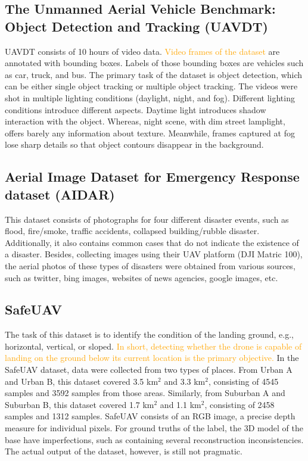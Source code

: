 \subsection{The Unmanned Aerial Vehicle Benchmark: Object Detection and Tracking (UAVDT)}
UAVDT consists of 10 hours of video data. \textcolor{orange}{Video frames of the dataset} are annotated with bounding boxes. Labels of those bounding boxes are vehicles such as car, truck, and bus. The primary task of the dataset is object detection, which can be either single object tracking or multiple object tracking.  The videos were shot in multiple lighting conditions (daylight, night, and fog). Different lighting conditions introduce different aspects. Daytime light introduces shadow interaction with the object. Whereas, night scene, with dim street lamplight, offers barely any information about texture. Meanwhile, frames captured at fog lose sharp details so that object contours disappear in the background.

\subsection{Aerial Image Dataset for Emergency Response dataset (AIDAR)}

This dataset consists of photographs for four different disaster events, such as flood, fire/smoke, traffic accidents, collapsed building/rubble disaster. Additionally, it also contains common cases that do not indicate the existence of a disaster. Besides, collecting images using their UAV platform (DJI Matric 100), the aerial photos of these types of disasters were obtained from various sources, such as twitter, bing images, websites of news agencies, google images, etc.

\subsection{SafeUAV}

The task of this dataset is to identify the condition of the landing ground, e.g., horizontal, vertical, or sloped. \textcolor{orange}{In short, detecting whether the drone is capable of landing on the ground below its current location is the primary objective.} In the SafeUAV dataset, data were collected from two types of places. From Urban A and Urban B, this dataset covered 3.5 km$^2$ and 3.3 km$^2$, consisting of 4545 samples and 3592 samples from those areas. Similarly, from Suburban A and Suburban B, this dataset covered 1.7 km$^2$ and 1.1 km$^2$, consisting of 2458 samples and 1312 samples. SafeUAV consists of an RGB image, a precise depth measure for individual pixels. For ground truths of the label, the 3D model of the base have imperfections, such as containing several reconstruction inconsistencies. The actual output of the dataset, however, is still not pragmatic.

